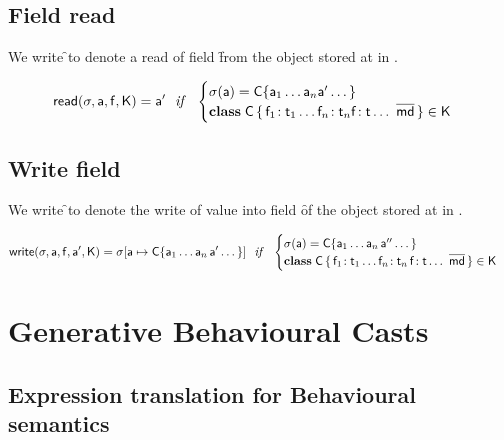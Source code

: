\documentclass[a4paper,USenglish]{tex/lipics-v2016}
\begin{document}
\subsection{Field read}

We write \readf\s\a\f\K to denote a read of field \f from the object
stored at \a in \s.

\begin{equation*}
\readf \s\a\f\K = \ap 
  ~~\mathit{if}~~ \begin{cases}  \s(\a) = \obj\C{\a_1\dots\a_n \ap \dots}\\
 \Class\C {\Fdef{\f_1}{\t_1}\dots\Fdef{\f_n}{\t_n}\Ftype\f\t\dots}{\b\md}\in\K
 \end{cases}
\end{equation*}

\subsection{Write field}

We write \setf\s\a\f\ap\K to denote the write of value \ap into field \f of
the object stored at \a in \s.

\begin{equation*}
\setf \s\a\f\ap\K= \Map\s{\Bind{\a}{\obj\C{\a_1\dots\a_n\,\ap\dots}}}
  ~~\mathit{if}~~ \begin{cases}
   \s(\a) = \obj\C{\a_1\dots\a_n\,\app\dots}\\
   \Class\C{\Fdef{\f_1}{\t_1}\dots\Fdef{\f_n}{\t_n}\,\Fdef\f\t\dots}{\b\md}\in\K
\end{cases}
\end{equation*}


\section{Generative Behavioural Casts}

\subsection{Expression translation for Behavioural semantics}\label{behtrans}
\end{document}
